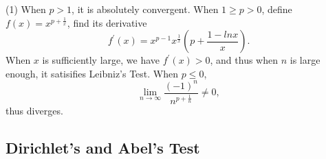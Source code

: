 \begin{solution}
  (1) When $p > 1$, it is absolutely convergent.
  When $1 \geq p > 0$, define $f(x) = x^{p + \frac{1}{x}}$,
  find its derivative
  \begin{equation}
    f^{\prime}(x) = x^{p-1}x^{\frac{1}{x}} \left( p + \frac{1 - ln x}{x} \right).
  \end{equation}
  When $x$ is sufficiently large, we have $f^{\prime}(x) > 0$,
  and thus when $n$ is large enough, it satisifies Leibniz's Test.
  When $p \leq 0$,
  \begin{equation}
    \lim \limits _{n \rightarrow \infty} \frac{(-1)^n}{n^{p + \frac{1}{n}}} \neq 0,
  \end{equation}
  thus diverges.
\end{solution}

\subsection{Dirichlet's and Abel's Test}




